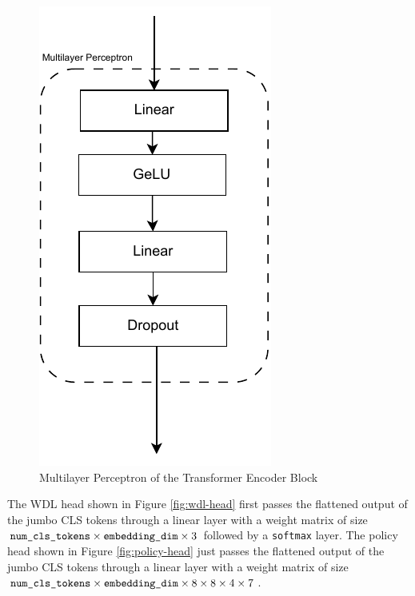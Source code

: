 \begin{figure}[H]
    \centering
    \includegraphics[width=0.2\linewidth]{images/MLP.pdf}
    \caption{Multilayer Perceptron of the Transformer Encoder Block}
    \label{fig:encoder-mlp}
\end{figure}

The WDL head shown in Figure \ref{fig:wdl-head} first passes the flattened output of the jumbo CLS tokens through a linear layer with a weight matrix of size $\verb|num_cls_tokens| \times \verb|embedding_dim| \times 3$ followed by a \verb|softmax| layer. The policy head shown in Figure \ref{fig:policy-head} just passes the flattened output of the jumbo CLS tokens through a linear layer with a weight matrix of size $\verb|num_cls_tokens| \times \verb|embedding_dim| \times 8 \times 8 \times  4 \times 7$.

